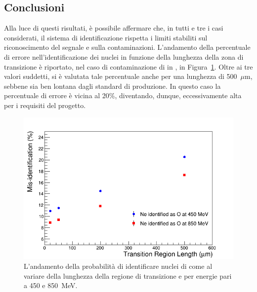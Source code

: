 \subsection*{Conclusioni}


Alla luce di questi risultati, è possibile affermare che, in tutti e tre i casi considerati, il sistema di identificazione rispetta i limiti stabiliti sul riconoscimento del segnale e sulla contaminazioni.
L'andamento della percentuale di errore nell'identificazione dei nuclei in funzione della lunghezza della zona di transizione è riportato, nel caso di contaminazione di  in , in Figura~\ref{fig:misident_vs_length}.
Oltre ai tre valori suddetti, si è valutata tale percentuale anche per una lunghezza di 500~$\mu$m, sebbene sia ben lontana dagli standard di produzione.
In questo caso la percentuale di errore è vicina al 20\%, diventando, dunque, eccessivamente alta per i requisiti del progetto.







\begin{figure} [!t]
	\centering
	\includegraphics[width=\textwidth, keepaspectratio]{Grafici_Tesi/Cornice/misident_length2.png}
	\caption{L'andamento della probabilità di identificare nuclei di  come  al variare della lunghezza della regione di transizione e per energie pari a 450 e 850~MeV.} \label{fig:misident_vs_length}
\end{figure}



